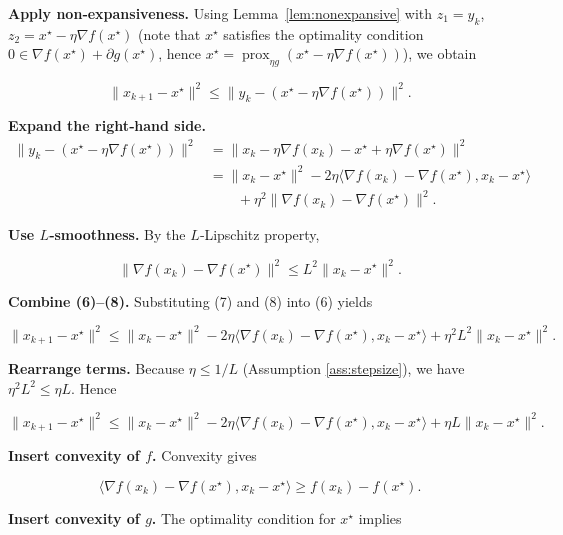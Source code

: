 \documentclass{article}
\begin{document}
\begin{enumerate}[label={[\textbf{Step \arabic*}]}]
\item \textbf{Apply non‑expansiveness.} Using Lemma~\ref{lem:nonexpansive} with $z_1=y_k$, $z_2=x^\star-\eta\nabla f(x^\star)$ (note that $x^\star$ satisfies the optimality condition $0\in\nabla f(x^\star)+\partial g(x^\star)$, hence $x^\star=\operatorname{prox}_{\eta g}(x^\star-\eta\nabla f(x^\star))$), we obtain  

\[
\|x_{k+1}-x^\star\|^2
\le\|y_k-(x^\star-\eta\nabla f(x^\star))\|^2.
\tag{6}
\]

\item \textbf{Expand the right‑hand side.}  
\[
\begin{aligned}
\|y_k-(x^\star-\eta\nabla f(x^\star))\|^2
&=\|x_k-\eta\nabla f(x_k)-x^\star+\eta\nabla f(x^\star)\|^2\\
&=\|x_k-x^\star\|^2-2\eta\langle\nabla f(x_k)-\nabla f(x^\star),x_k-x^\star\rangle\\
&\qquad+\eta^2\|\nabla f(x_k)-\nabla f(x^\star)\|^2.
\end{aligned}
\tag{7}
\]

\item \textbf{Use $L$‑smoothness.} By the $L$‑Lipschitz property,  

\[
\|\nabla f(x_k)-\nabla f(x^\star)\|^2\le L^2\|x_k-x^\star\|^2.
\tag{8}
\]

\item \textbf{Combine (6)–(8).} Substituting (7) and (8) into (6) yields  

\[
\|x_{k+1}-x^\star\|^2
\le\|x_k-x^\star\|^2-2\eta\langle\nabla f(x_k)-\nabla f(x^\star),x_k-x^\star\rangle
+\eta^2L^2\|x_k-x^\star\|^2.
\tag{9}
\]

\item \textbf{Rearrange terms.} Because $\eta\le 1/L$ (Assumption \ref{ass:stepsize}), we have $\eta^2L^2\le\eta L$. Hence  

\[
\|x_{k+1}-x^\star\|^2
\le\|x_k-x^\star\|^2-2\eta\langle\nabla f(x_k)-\nabla f(x^\star),x_k-x^\star\rangle
+\eta L\|x_k-x^\star\|^2.
\tag{10}
\]

\item \textbf{Insert convexity of $f$.} Convexity gives  

\[
\langle\nabla f(x_k)-\nabla f(x^\star),x_k-x^\star\rangle\ge f(x_k)-f(x^\star).
\tag{11}
\]

\item \textbf{Insert convexity of $g$.} The optimality condition for $x^\star$ implies  


\end{enumerate}
\end{document}
